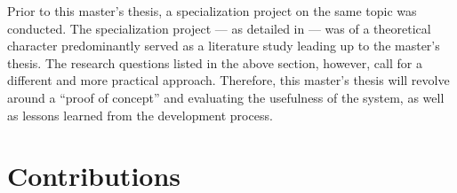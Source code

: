 Prior to this master's thesis, a specialization project on the same topic was conducted. The specialization project --- as detailed in \citep{holmLLMsDeathGIS2023} --- was of a theoretical character predominantly served as a literature study leading up to the master's thesis. The research questions listed in the above section, however, call for a different and more practical approach. Therefore, this master's thesis will revolve around a \enquote{proof of concept} and evaluating the usefulness of the system, as well as lessons learned from the development process.



\section{Contributions}
\label{sec:introContributions}

\begin{comment}
This section just provides a brief summary of the main contributions of the work.
The main description of the contributions will come in Section~\ref{sec:contributions}, after the results are presented.
(Hence Section~\ref{sec:introContributions} can also be left out, leaving the discussion completely to Section~\ref{sec:contributions}.)

The format of this section will generally be as follows:

\begin{enumerate}
    \item \textit{Lorem ipsum dolor sit amet, consectetur adipiscing elit.}
    \item \textit{Lorem ipsum dolor sit amet, consectetur adipiscing elit.}
    \item \textit{Lorem ipsum dolor sit amet, consectetur adipiscing elit.}
\end{enumerate}

\noindent
where the items on the list briefly describe the key contributions.

The order of the contributions here is important. List your main contribution first!
Creating this list will help you not only with writing the Conclusion (where all items listed here definitely should be included, and in more detail),
but also with items that need to be mentioned in the Abstract, as well as with points that you will want to bring to attention in the Discussion.
Hence most of the content on this list will be addressed 4--5 times in your text: here, in the Abstract, Discussion, Conclusion, and (most likely)
in the Results chapter.
\end{comment}

